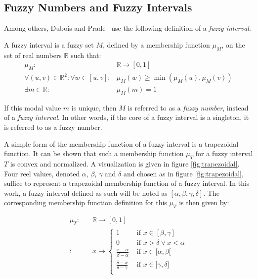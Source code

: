\subsection{\label{subsec:fuzzy-numbers}Fuzzy Numbers and Fuzzy Intervals}
Among others, Dubois and Prade~\cite{Dubois1983} use the following definition of a \emph{fuzzy interval}.
\begin{definition}
A fuzzy interval is a fuzzy set $M$, defined by a membership function $\mu_{M}$, on the set of real numbers $\mathbb{R}$ such that:
\begin{eqnarray}
\mu_{M} : & \!\!\!\!\!\!\!\!\!\!\!\!\!\!\!\!\!\!\!\!\!\!\!\!\!\!\!\!\!\!\!\!\!\!\!\!\!\!\!\!\!\!\!\!\!\!\!\!\!\! \mathbb{R} \rightarrow \left[0,1\right] \nonumber \\ 
\forall (u,v)\in\mathbb{R}^2: \forall w \in [u,v]:&\mu_M(w) \geq\min(\mu_M(u),\mu_M(v))  \\
\exists m \in \mathbb{R} : & \!\!\!\!\!\!\!\!\!\!\!\!\!\!\!\!\!\!\!\!\!\!\!\!\!\!\!\!\!\!\!\!\!\!\!\!\!\!\!\!\!\!\!\!\!\!\!\! \mu_M(m)=1 
\end{eqnarray}
\end{definition}
If this modal value $m$ is unique, then $M$ is referred to as a \emph{fuzzy number}, instead of a \emph{fuzzy interval}. In other words, if the core of a fuzzy interval is a singleton, it is referred to as a fuzzy number.

A simple form of the membership function of a fuzzy interval is a trapezoidal function. It can be shown that such a membership function $\mu_T$ for a fuzzy interval $T$ is convex and normalized. A visualization is given in figure \ref{fig:trapezoidal}. Four reel values, denoted $\alpha$, $\beta$, $\gamma$ and $\delta$ and chosen as in figure \ref{fig:trapezoidal}, suffice to represent a trapezoidal membership function of a fuzzy interval. In this work, a fuzzy interval defined as such will be noted as $\left[\alpha, \beta, \gamma, \delta\right]$. The corresponding membership function definition for this $\mu_T$ is then given by:

\begin{align}
\mu_T : & \quad \mathbb{R} \rightarrow \left[0,1\right] \\
 : & \quad x \rightarrow
\begin{cases}
1 & \mbox{ if } x \in [\beta,\gamma] \\
0 & \mbox{ if } x > \delta \vee x < \alpha \\
\frac{x-\alpha}{\beta - \alpha} & \mbox{ if } x \in [\alpha,\beta[ \\
\frac{\delta -x}{\delta - \gamma} & \mbox{ if } x \in ]\gamma,\delta] \\
\end{cases}
\end{align}

